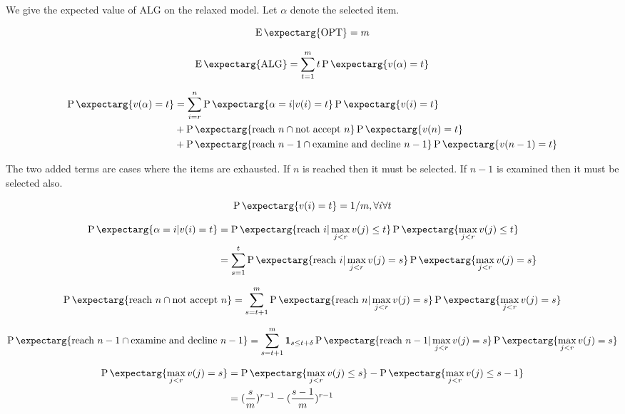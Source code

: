 \documentclass{article}
\newcommand{\expect}{\operatorname{E}\expectarg}
\newcommand{\prob}{\operatorname{P}\expectarg}
\begin{document}
\newpage

\newcommand{\ALG}{\text{ALG}}
\newcommand{\OPT}{\text{OPT}}
\newcommand{\ind}{\textbf{1}}

We give the expected value of $\ALG$ on the relaxed model. Let $\alpha$ denote the selected item.

\begin{equation}
  \expect{\OPT}=m
\end{equation}

\begin{equation}
  \expect{\ALG}=\sum_{t=1}^m t\prob{v(\alpha)=t}
\end{equation}

\begin{align}
  \prob{v(\alpha)=t} &= \sum_{i=r}^n
  \prob{\alpha = i | v(i)=t}
  \prob{v(i)=t}\\&+
  \prob{\text{reach }n \cap \text{not accept }n} \prob{v(n)=t}\\&+
  \prob{\text{reach }n-1 \cap \text{examine and decline }n-1}\prob{v(n-1)=t}
\end{align}

The two added terms are cases where the items are exhausted. If $n$ is reached then it must be selected. If $n-1$ is examined then it must be selected also.

\begin{equation}
  \prob{v(i)=t}=1/m, \forall i\forall t
\end{equation}

\begin{align}
  \prob{\alpha = i | v(i)=t} &= \prob{\text{reach }i|\max_{j<r}v(j)\leq t}\prob{\max_{j<r}v(j)\leq t}\\&=
  \sum_{s=1}^t \prob{\text{reach }i|\max_{j<r}v(j)= s}\prob{\max_{j<r}v(j)= s}
\end{align}

\begin{equation}\label{eqn:exhaust1}
	\prob{\text{reach }n \cap \text{not accept }n}
	=\sum_{s=t+1}^m
		\prob{\text{reach }n|\max_{j<r}v(j)= s}\prob{\max_{j<r}v(j)= s}
\end{equation}

\begin{equation}\label{eqn:exhaust2}
	\prob{\text{reach }n-1 \cap \text{examine and decline }n-1}
	=\sum_{s=t+1}^m
		\ind_{s\leq t + \delta}
		\prob{\text{reach }n-1|\max_{j<r}v(j)= s}\prob{\max_{j<r}v(j)= s}
\end{equation}

\begin{align}
\prob{\max_{j<r}v(j)= s} 
	&= \prob{\max_{j<r}v(j)\leq s}-\prob{\max_{j<r}v(j)\leq s-1}\\
	&= (\frac{s}{m})^{r-1}-(\frac{s-1}{m})^{r-1}
\end{align}
\end{document}
